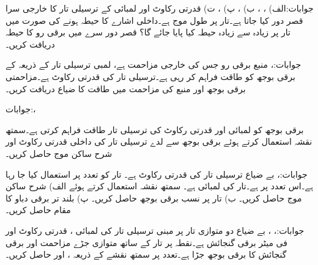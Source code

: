 جوابات:الف) ، ،  ب) ،  پ) ،  ت) 
قدرتی رکاوٹ  اور لمبائی  کے ترسیلی تار کا خارجی سرا قصر دور کیا جاتا ہے۔تار پر طول موج  ہے۔داخلی اشارے کا حیطہ  ہونے کی صورت میں تار پر زیادہ سے زیادہ حیطہ کیا پایا جائے گا؟ قصر دور سرے میں برقی رو کا حیطہ دریافت کریں۔

جوابات:، 
منبع برقی رو  جس کی خارجی مزاحمت  ہے،  لمبی ترسیلی تار کے ذریعہ  کے برقی بوجھ کو طاقت فراہم کر رہی ہے۔ترسیلی تار کی قدرتی رکاوٹ  ہے۔مزاحمتی برقی بوجھ اور منبع کی مزاحمت میں طاقت کا ضیاع دریافت کریں۔

جوابات:، 

برقی بوجھ  کو  لمبائی اور  قدرتی رکاوٹ کی ترسیلی تار طاقت فراہم کرتی ہے۔سمتھ نقشہ استعمال کرتے ہوئے برقی بوجھ سے لدے  ترسیلی تار کی داخلی قدرتی رکاوٹ  اور شرح ساکن موج  حاصل کریں۔

جوابات:، 
بے ضیاع ترسیلی تار کی قدرتی رکاوٹ   ہے۔ تار کو  تعدد پر استعمال کیا جا رہا ہے۔اس
 تعدد پر  ہے۔تار کی لمبائی  ہے۔ سمتھ نقشہ استعمال کرتے ہوئے  الف) شرح ساکن موج حاصل کریں۔ ب) تار پر نسب برقی بوجھ  حاصل کریں۔ پ) بلند تر برقی دباو کا مقام حاصل کریں۔

جوابات:، ، 
بے ضیاع دو متوازی تار پر مبنی ترسیلی تار کی لمبائی ، قدرتی رکاوٹ  اور فی میٹر برقی گنجائش  ہے۔نقطہ  پر تار کے ساتھ متوازی جڑے مزاحمت  اور برقی گنجائش  کا برقی بوجھ جڑا ہے۔تعدد  پر سمتھ نقشے کے ذریعہ ،  اور  حاصل کریں۔

